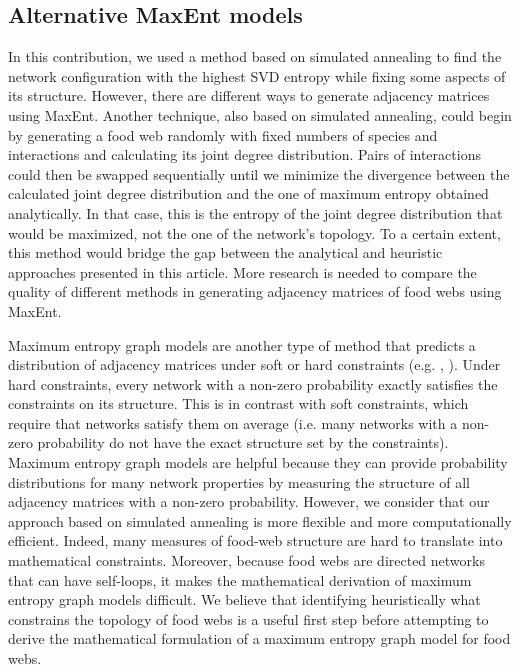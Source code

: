 \subsection{Alternative MaxEnt models}

In this contribution, we used a method based on simulated annealing to find the
network configuration with the highest SVD entropy while fixing some aspects of
its structure. However, there are different ways to generate adjacency matrices
using MaxEnt. Another technique, also based on simulated annealing, could begin
by generating a food web randomly with fixed numbers of species and interactions
and calculating its joint degree distribution. Pairs of interactions could then
be swapped sequentially until we minimize the divergence between the calculated
joint degree distribution and the one of maximum entropy obtained analytically.
In that case, this is the entropy of the joint degree distribution that would be
maximized, not the one of the network's topology. To a certain extent, this
method would bridge the gap between the analytical and heuristic approaches
presented in this article. More research is needed to compare the quality of
different methods in generating adjacency matrices of food webs using MaxEnt.  

Maximum entropy graph models are another type of method that predicts a
distribution of adjacency matrices under soft or hard constraints (e.g. \cite{Park2004Statistical}, 
\cite{Cimini2019Statistical}). Under hard constraints, every
network with a non-zero probability exactly satisfies the constraints on its
structure. This is in contrast with soft constraints, which require that
networks satisfy them on average (i.e. many networks with a non-zero probability
do not have the exact structure set by the constraints). Maximum entropy graph
models are helpful because they can provide probability distributions for many
network properties by measuring the structure of all adjacency matrices with a
non-zero probability. However, we consider that our approach based on simulated
annealing is more flexible and more computationally efficient. Indeed, many
measures of food-web structure are hard to translate into mathematical
constraints. Moreover, because food webs are directed networks that can have
self-loops, it makes the mathematical derivation of maximum entropy graph models
difficult. We believe that identifying heuristically what constrains the
topology of food webs is a useful first step before attempting to derive the
mathematical formulation of a maximum entropy graph model for food webs. 

